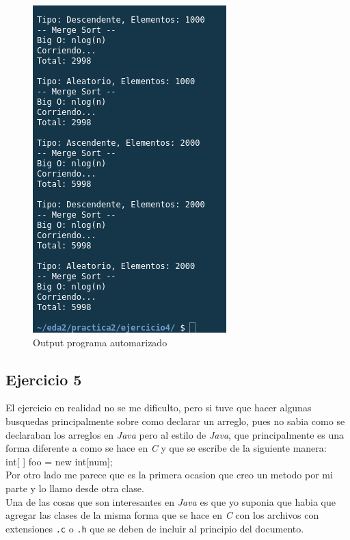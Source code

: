 \documentclass{article}
\begin{document}
		\begin{figure}[H]
			\centering
			\includegraphics[scale = 1]{images/e410.png}
			\caption{Output programa automarizado}
		\end{figure}
	
		\subsection{Ejercicio 5}
		
		El ejercicio en realidad no se me dificulto, pero si tuve que hacer algunas busquedas principalmente sobre como declarar un arreglo, pues no sabia como se declaraban los arreglos en \emph{Java} pero al estilo de \emph{Java}, que principalmente es una forma diferente a como se hace en \emph{C} y que se escribe de la siguiente manera:\\
		
		int[ ] foo = new int[num];\\
		
		Por otro lado me parece que es la primera ocasion que creo un metodo por mi parte y lo llamo desde otra clase.\\
		
		Una de las cosas que son interesantes en \emph{Java} es que yo suponia que habia que agregar las clases de la misma forma que se hace en \emph{C} con los archivos con extensiones \verb*|.c| o \verb*|.h| que se deben de incluir al principio del documento.\\
		
\end{document}
